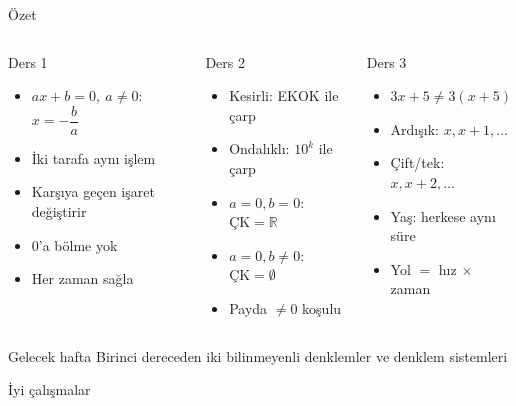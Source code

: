 \documentclass[aspectratio=169,11pt]{beamer}
\begin{document}
\begin{frame}{Özet}
\begin{columns}[t]
\begin{block}{Ders 1}
\small
\begin{itemize}
\item \(ax+b=0,\ a\neq0\): \(x=-\dfrac{b}{a}\)
\item İki tarafa aynı işlem
\item Karşıya geçen işaret değiştirir
\item \(0\)'a bölme yok
\item Her zaman sağla
\end{itemize}
\end{block}
\begin{block}{Ders 2}
\small
\begin{itemize}
\item Kesirli: EKOK ile çarp
\item Ondalıklı: \(10^{k}\) ile çarp
\item \(a=0,b=0\): \(\text{ÇK}=\mathbb{R}\)
\item \(a=0,b\neq0\): \(\text{ÇK}=\emptyset\)
\item Payda \(\neq 0\) koşulu
\end{itemize}
\end{block}
\begin{block}{Ders 3}
\small
\begin{itemize}
\item \(3x+5\neq 3(x+5)\)
\item Ardışık: \(x, x+1, \dots\)
\item Çift/tek: \(x, x+2, \dots\)
\item Yaş: herkese aynı süre
\item Yol \(=\) hız \(\times\) zaman
\end{itemize}
\end{block}
\end{columns}
\vspace{6pt}
\begin{alertblock}{Gelecek hafta}
Birinci dereceden iki bilinmeyenli denklemler ve denklem sistemleri
\end{alertblock}
\end{frame}

\begin{frame}
\centering\Large İyi çalışmalar
\end{frame}
\end{document}
